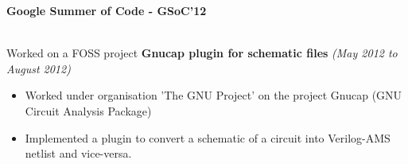 \documentclass[a4paper,10pt]{article}
\newcommand{\resheading}[1]{{\small \colorbox{mygrey}{\begin{minipage}{0.975\textwidth}{\textbf{#1 \vphantom{p\^{E}}}}\end{minipage}}}}
\begin{document}
\resheading{\textbf{\large Google Summer of Code - GSoC'12}} \\ 

\hspace{1mm} Worked on a FOSS project \textbf{Gnucap plugin for schematic files} \hfill \emph{(May 2012 to August 2012)} \\[-0.6cm]
    \begin{itemize}
        \item Worked under organisation 'The GNU Project' on the project Gnucap (GNU Circuit Analysis Package)\\[-0.6cm]
        \item Implemented a plugin to convert a schematic of a circuit into Verilog-AMS netlist and vice-versa.\\[-0.5cm]
    \end{itemize}
\end{document}
